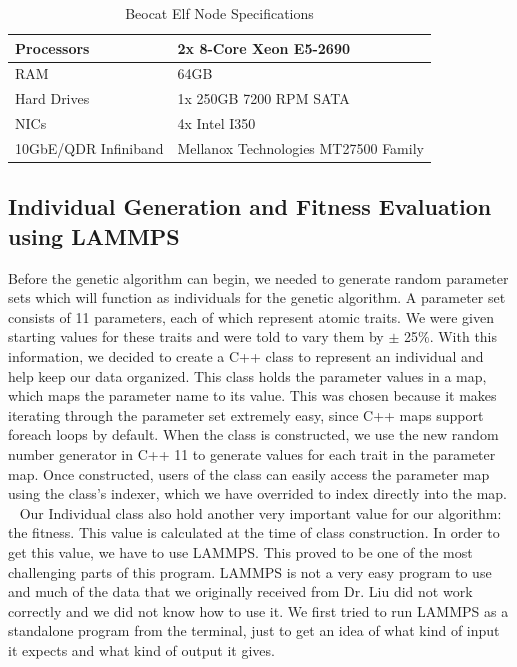 \documentclass[letterpaper, 12pt]{article}
\begin{document}
\begin{flushleft}
\begin{table}[ht]
	\centering
	\caption{Beocat Elf Node Specifications}
	\label{nodespecs}
	\begin{tabular}{|l|l|}
		\hline
		Processors           & 2x 8-Core Xeon E5-2690               \\ \hline
		RAM                  & 64GB                                 \\ \hline
		Hard Drives          & 1x 250GB 7200 RPM SATA               \\ \hline
		NICs                 & 4x Intel I350                        \\ \hline
		10GbE/QDR Infiniband & Mellanox Technologies MT27500 Family \\ \hline
	\end{tabular}
\end{table}

\subsection*{Individual Generation and Fitness Evaluation using LAMMPS}

Before the genetic algorithm can begin, we needed to generate random parameter sets which will function as individuals for the genetic algorithm. 
A parameter set consists of 11 parameters, each of which represent atomic traits. We were given starting values for these traits and were told to vary them by $\pm$ 25\%. 
With this information, we decided to create a C++ class to represent an individual and help keep our data organized. This class holds the parameter values in a map, which maps the parameter name to its value. 
This was chosen because it makes iterating through the parameter set extremely easy, since C++ maps support foreach loops by default. When the class is constructed, we use the new
random number generator in C++ 11 to generate values for each trait in the parameter map. Once constructed, users of the class can easily access the parameter map using the class's 
indexer, which we have overrided to index directly into the map. \\
~\newline
Our Individual class also hold another very important value for our algorithm: the fitness. This value is calculated at the time of class construction. In order to get this value,
we have to use LAMMPS. This proved to be one of the most challenging parts of this program. LAMMPS is not a very easy program to use and much of the data that we originally received
from Dr. Liu did not work correctly and we did not know how to use it. We first tried to run LAMMPS as a standalone program from the terminal, just to get an idea of what kind of
input it expects and what kind of output it gives. 


\end{flushleft}
\end{document}
